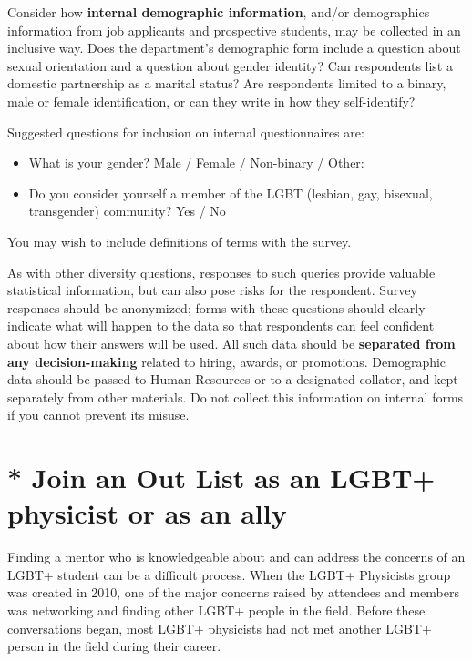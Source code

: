 Consider how \textbf{internal demographic information}, and/or demographics information from job applicants and prospective students, may be collected in an inclusive way. Does the department's demographic form include a question about sexual orientation and a question about gender identity? Can respondents list a domestic partnership as a marital status? Are respondents limited to a binary, male or female identification, or can they write in how they self-identify?

Suggested questions for inclusion on internal questionnaires are:
\begin{itemize}
	\item What is your gender? Male / Female / Non-binary / Other:\noindent\underline{\makebox[0.5in][l]{}}
	\item Do you consider yourself a member of the LGBT (lesbian, gay, bisexual, transgender) community? Yes / No
\end{itemize}

You may wish to include definitions of terms with the survey.

As with other diversity questions, responses to such queries provide valuable statistical information, but can also pose risks for the respondent. Survey responses should be anonymized; forms with these questions should clearly indicate what will happen to the data so that respondents can feel confident about how their answers will be used. All such data should be \textbf{separated from any decision-making} related to hiring, awards, or promotions. Demographic data should be passed to Human Resources or to a designated collator, and kept separately from other materials. Do not collect this information on internal forms if you cannot prevent its misuse.

\section {* Join an Out List as an LGBT+ physicist or as an ally}
\label{outlist}
Finding a mentor who is knowledgeable about and can address the concerns of an LGBT+ student can be a difficult process. When the LGBT+ Physicists group was created in 2010, one of the major concerns raised by attendees and members was networking and finding other LGBT+ people in the field. Before these conversations began, most LGBT+ physicists had not met another LGBT+ person in the field during their career.

